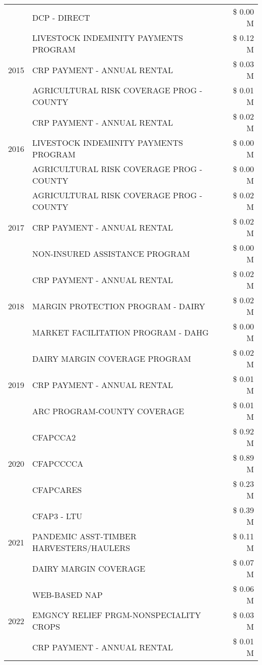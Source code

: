 \begin{tabular}{llr}
 & DCP - DIRECT & \$ 0.00 M \\
\cline{1-3}
\multirow[t]{3}{*}{2015} & LIVESTOCK INDEMINITY PAYMENTS PROGRAM & \$ 0.12 M \\
 & CRP PAYMENT - ANNUAL RENTAL & \$ 0.03 M \\
 & AGRICULTURAL RISK COVERAGE PROG - COUNTY & \$ 0.01 M \\
\cline{1-3}
\multirow[t]{3}{*}{2016} & CRP PAYMENT - ANNUAL RENTAL & \$ 0.02 M \\
 & LIVESTOCK INDEMINITY PAYMENTS PROGRAM & \$ 0.00 M \\
 & AGRICULTURAL RISK COVERAGE PROG - COUNTY & \$ 0.00 M \\
\cline{1-3}
\multirow[t]{3}{*}{2017} & AGRICULTURAL RISK COVERAGE PROG - COUNTY & \$ 0.02 M \\
 & CRP PAYMENT - ANNUAL RENTAL & \$ 0.02 M \\
 & NON-INSURED ASSISTANCE PROGRAM & \$ 0.00 M \\
\cline{1-3}
\multirow[t]{3}{*}{2018} & CRP PAYMENT - ANNUAL RENTAL & \$ 0.02 M \\
 & MARGIN PROTECTION PROGRAM - DAIRY & \$ 0.02 M \\
 & MARKET FACILITATION PROGRAM - DAHG & \$ 0.00 M \\
\cline{1-3}
\multirow[t]{3}{*}{2019} & DAIRY MARGIN COVERAGE PROGRAM & \$ 0.02 M \\
 & CRP PAYMENT - ANNUAL RENTAL & \$ 0.01 M \\
 & ARC PROGRAM-COUNTY COVERAGE & \$ 0.01 M \\
\cline{1-3}
\multirow[t]{3}{*}{2020} & CFAPCCA2 & \$ 0.92 M \\
 & CFAPCCCCA & \$ 0.89 M \\
 & CFAPCARES & \$ 0.23 M \\
\cline{1-3}
\multirow[t]{3}{*}{2021} & CFAP3 - LTU & \$ 0.39 M \\
 & PANDEMIC ASST-TIMBER HARVESTERS/HAULERS & \$ 0.11 M \\
 & DAIRY MARGIN COVERAGE & \$ 0.07 M \\
\cline{1-3}
\multirow[t]{3}{*}{2022} & WEB-BASED NAP & \$ 0.06 M \\
 & EMGNCY RELIEF PRGM-NONSPECIALITY CROPS & \$ 0.03 M \\
 & CRP PAYMENT - ANNUAL RENTAL & \$ 0.01 M \\
\cline{1-3}
\bottomrule
\end{tabular}
